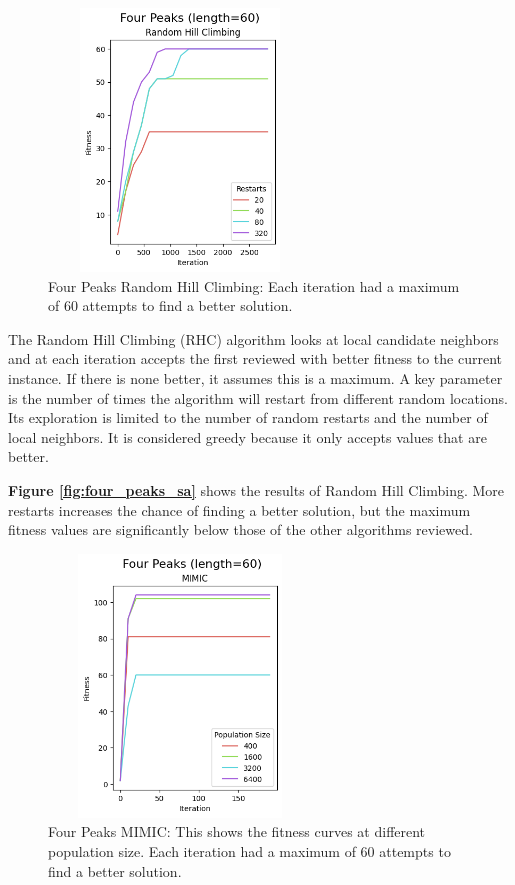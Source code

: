 \documentclass[letterpaper]{article} %
\begin{document}
\begin{figure}[!htb]
\centering
\includegraphics[width=2.75in, height=2.75in]{figures/Four_Peaks_length=60_Random_Hill_Climbing_l_60_ma_120_r_20__40__80__320_.png}
\caption{Four Peaks Random Hill Climbing: Each iteration had a maximum of 60 attempts to find a better solution. }
\label{fig:four_peaks_rhc}
\end{figure}


The Random Hill Climbing (RHC) algorithm looks at local candidate neighbors and at each iteration accepts the first reviewed with better fitness to the current instance.  If there is none better, it assumes this is a maximum.   A key parameter is the number of times the algorithm will restart from different random locations.   Its exploration is limited to the number of random restarts and the number of local neighbors.  It is considered greedy because it only accepts values that are better.

\textbf{Figure \ref{fig:four_peaks_sa}}  shows the results of Random Hill Climbing.  More restarts increases the chance of finding a better solution, but the maximum fitness values are significantly below those of the other algorithms reviewed.

\begin{figure}[!htb]
\centering
\includegraphics[width=2.75in, height=2.75in]{figures/Four_Peaks_length=60_MIMIC_l_60_ma_60_p_400__1600__3200__6400_k_0.1_.png}
\caption{Four Peaks MIMIC:  This shows the fitness curves at different population size. Each iteration had a maximum of 60 attempts to find a better solution. }
\label{fig:four_peaks_mimic}
\end{figure}
\end{document}
